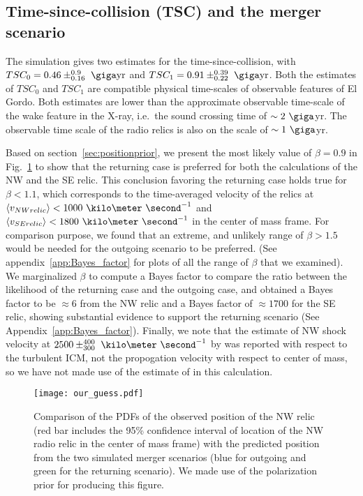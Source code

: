 \subsection{Time-since-collision (TSC) and the merger scenario}
The simulation gives two estimates for
the time-since-collision, with $TSC_0 = 0.46\pm^{0.9}_{0.16}~\giga \text{yr}$
and $TSC_1 =0.91\pm^{0.39}_{0.22}~\giga\text{yr}$. Both the estimates of $TSC_0$ and $TSC_1$ are
compatible physical time-scales of observable features of El Gordo.  
Both estimates are lower than the approximate observable time-scale of the
wake feature in the X-ray, i.e.\ the sound crossing time of $\sim2~\giga$yr. 
The observable time scale of the radio relics is also on the scale of
$\sim1~\giga$yr.\par 
Based on section~\ref{sec:positionprior}, we present the most likely
value of $\beta = 0.9$ in Fig.~\ref{fig:our_guessed_scenario} to show that
the returning case is preferred for both the calculations of the NW and the
SE relic. This conclusion favoring the returning case holds true for $\beta
< 1.1$, which corresponds to the time-averaged velocity of the relics at
$\langle v_{NW relic} \rangle < 1000~\kilo\meter~\second^{-1}$ and $\langle
v_{SE relic} \rangle < 1800~\kilo\meter~\second^{-1}$  in the center of
mass frame. For comparison purpose, we found that an extreme, and unlikely
range of $\beta > 1.5$ would be needed for the outgoing scenario to be
preferred. (See appendix~\ref{app:Bayes_factor} for plots of all the range
of $\beta$ that we examined). We marginalized $\beta$ to compute a Bayes
factor to compare the ratio between the likelihood of the returning case
and the outgoing case, and obtained a Bayes factor to be $\approx 6$ from
the NW relic and a Bayes factor of $\approx 1700$ for the SE relic, showing
substantial evidence to support the returning scenario  (See Appendix~\ref{app:Bayes_factor}).  Finally, we note that the estimate of NW shock velocity at $2500
\pm^{400}_{300}~\kilo\meter~\second^{-1}$ by \cite{L13} was reported with respect to
the turbulent ICM, not the propogation velocity with respect to center of
mass, so we have not made use of the estimate of \cite{L13} in this calculation. 
\begin{figure}
	\texttt{[image: our\_guess.pdf]}
	\caption{Comparison of the PDFs of the observed position of the NW relic (red bar
		includes the 95\% confidence interval of location of the NW radio relic in the center of mass frame) with the predicted position from the two simulated merger
		scenarios (blue for outgoing and green for the returning scenario).
	We made use of the polarization prior for producing this figure.} 
	\label{fig:our_guessed_scenario}
\end{figure}

